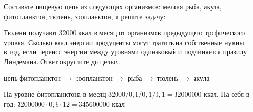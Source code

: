 
Составьте
пищевую цепь из следующих организмов: мелкая рыба, акула, фитопланктон, тюлень,
зоопланктон, и решите задачу:

Тюлени
получают 32000 ккал в месяц от организмов предыдущего трофического уровня.
Сколько ккал энергии продуценты могут тратить на собственные нужны в год, если
перенос энергии между уровнями одинаковый и подчиняется правилу Линдемана.
Ответ округлите до целых.

\soultionSection

цепь фитопланктон $\rightarrow$ зоопланктон $\rightarrow$ рыба $\rightarrow$ тюлень $\rightarrow$ акула

На уровне фитопланктона в месяц $32000/0,1/0,1/0,1=32000000$ ккал. 
На себя в год: $32000000 \cdot 0,9 \cdot 12=345 600 000$ ккал

